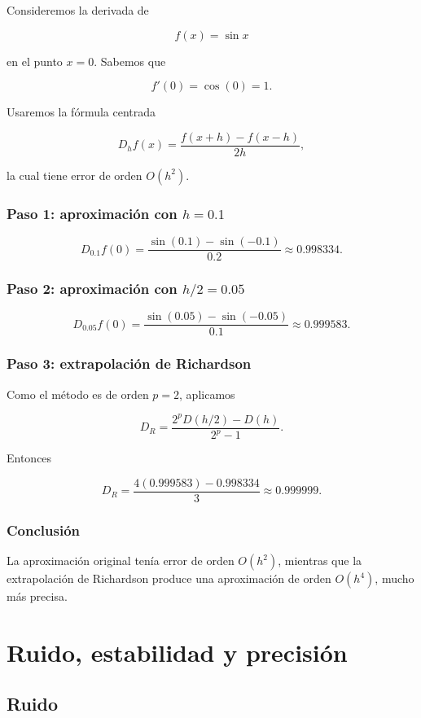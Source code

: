 \documentclass[12pt,a4paper]{article}
\theoremstyle{definition}
\theoremstyle{remark}
\begin{document}
Consideremos la derivada de

\[
f(x)=\sin x
\]

en el punto $x=0$. Sabemos que

\[
f'(0)=\cos(0)=1.
\]

Usaremos la fórmula centrada

\[
D_h f(x)=\frac{f(x+h)-f(x-h)}{2h},
\]

la cual tiene error de orden $O(h^2)$.

\subsubsection*{Paso 1: aproximación con $h=0.1$}

\[
D_{0.1}f(0)
=
\frac{\sin(0.1)-\sin(-0.1)}{0.2}
\approx 0.998334.
\]

\subsubsection*{Paso 2: aproximación con $h/2=0.05$}

\[
D_{0.05}f(0)
=
\frac{\sin(0.05)-\sin(-0.05)}{0.1}
\approx 0.999583.
\]

\subsubsection*{Paso 3: extrapolación de Richardson}

Como el método es de orden $p=2$, aplicamos

\[
D_R
=
\frac{2^p D(h/2)-D(h)}{2^p-1}.
\]

Entonces

\[
D_R
=
\frac{4(0.999583)-0.998334}{3}
\approx 0.999999.
\]

\subsubsection*{Conclusión}

La aproximación original tenía error de orden $O(h^2)$, mientras que
la extrapolación de Richardson produce una aproximación de orden $O(h^4)$,
mucho más precisa.


\section{Ruido, estabilidad y precisión}

\subsection{Ruido}
\end{document}
